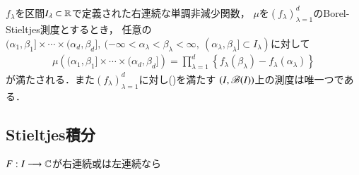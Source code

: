 	\begin{screen}
		\begin{thm}
			$f_\lambda$を区間$I_\lambda \subset \mathbb{R}$で定義された右連続な単調非減少関数，
			$\mu$を$(f_\lambda)_{\lambda=1}^d$のBorel-Stieltjes測度とするとき，
			任意の$(\alpha_1,\beta_1] \times \cdots \times (\alpha_d,\beta_d]
			,\ (-\infty < \alpha_\lambda < \beta_\lambda < \infty,\ (\alpha_\lambda,\beta_\lambda] \subset I_\lambda)$に対して
			\begin{align}
				\mu\left((\alpha_1,\beta_1] \times \cdots \times (\alpha_d,\beta_d]\right) 
				= \prod_{\lambda=1}^d \left\{ f_\lambda(\beta_\lambda) - f_\lambda(\alpha_\lambda) \right\}
				\label{eq:thm_uniqueness_of_Borel_Stieltjes_measure}
			\end{align}
			が満たされる．また$(f_\lambda)_{\lambda=1}^d$に対し()を満たす
			$(I,\mathscr{B}(I))$上の測度は唯一つである．
		\end{thm}
	\end{screen}
	
\subsection{Stieltjes積分}
	\begin{screen}
		\begin{thm}
			$F:I \longrightarrow \mathbb{C}$が右連続或は左連続なら
		\end{thm}
	\end{screen}
	
	\begin{screen}
		\begin{thm}[時間変更]
			
		\end{thm}
	\end{screen}
